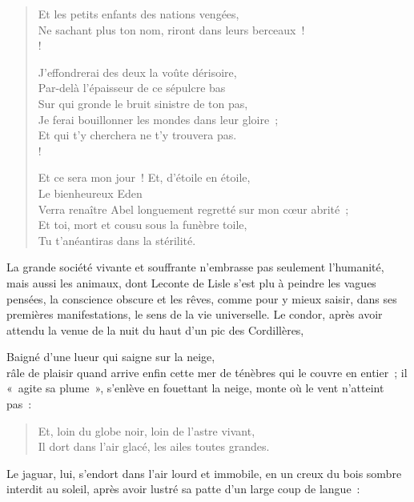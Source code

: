 \documentclass[french,twoside]{book} %
\begin{document}
\begin{verse}
Et les petits enfants des nations vengées,\\
Ne sachant plus ton nom, riront dans leurs berceaux !\\!

J’effondrerai des deux la voûte dérisoire,\\
Par-delà l’épaisseur de ce sépulcre bas\\
Sur qui gronde le bruit sinistre de ton pas,\\
Je ferai bouillonner les mondes dans leur gloire ;\\
Et qui t’y cherchera ne t’y trouvera pas.\\!

Et ce sera mon jour ! Et, d’étoile en étoile,\\
Le bienheureux Eden\\
Verra renaître Abel longuement regretté sur mon cœur abrité ;\\
Et toi, mort et cousu sous la funèbre toile,\\
Tu t’anéantiras dans la stérilité.\\
\end{verse}

\noindent La grande société vivante et souffrante n’embrasse pas seulement l’humanité, mais aussi les animaux, dont Leconte de Lisle s’est plu à peindre les vagues pensées, la conscience obscure et les rêves, comme pour y mieux saisir, dans ses premières manifestations, le sens de la vie universelle. Le condor, après avoir attendu la venue de la nuit du haut d’un pic des Cordillères,\par

Baigné d’une lueur qui saigne sur la neige,\\

\noindent râle de plaisir quand arrive enfin cette mer de ténèbres qui le couvre en entier ; il « agite sa plume », s’enlève en fouettant la neige, monte où le vent n’atteint pas :\par


\begin{verse}
Et, loin du globe noir, loin de l’astre vivant,\\
Il dort dans l’air glacé, les ailes toutes grandes.\\
\end{verse}

\noindent Le jaguar, lui, s’endort dans l’air lourd et immobile, en un creux du bois sombre interdit au soleil, après avoir lustré sa patte d’un large coup de langue :\par
\end{document}

